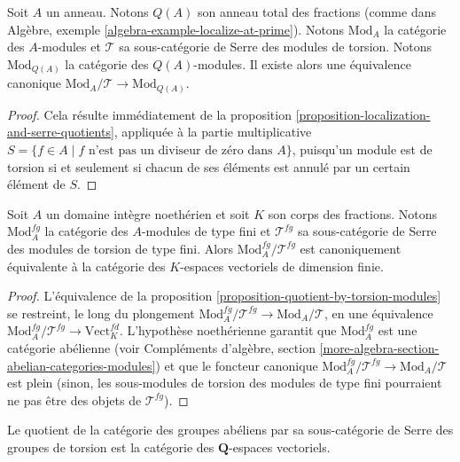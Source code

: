 \begin{proposition}
\label{proposition-quotient-by-torsion-modules}
Soit $A$ un anneau. Notons $Q(A)$ son anneau total des fractions
(comme dans Algèbre, exemple \ref{algebra-example-localize-at-prime}).
Notons $\text{Mod}_A$ la catégorie des $A$-modules et $\mathcal{T}$ sa
sous-catégorie de Serre des modules de torsion. Notons
$\text{Mod}_{Q(A)}$ la catégorie des $Q(A)$-modules.
Il existe alors une équivalence canonique
$\text{Mod}_A/\mathcal{T} \rightarrow \text{Mod}_{Q(A)}$.
\end{proposition}

\begin{proof}
Cela résulte immédiatement de la proposition \ref{proposition-localization-and-serre-quotients}, appliquée à la partie
multiplicative
$S = \{f \in A \mid f \text{ n'est pas un diviseur de zéro dans }A\}$,
puisqu'un module est de torsion si et seulement si chacun de ses éléments
est annulé par un certain élément de $S$.
\end{proof}

\begin{proposition}
\label{proposition-quotient-by-finitely-generated-torsion-modules}
Soit $A$ un domaine intègre noethérien et soit $K$ son corps des fractions.
Notons $\text{Mod}_A^{fg}$ la catégorie des $A$-modules de type fini
et $\mathcal{T}^{fg}$ sa sous-catégorie de Serre des modules de torsion
de type fini. Alors $\text{Mod}_A^{fg}/\mathcal{T}^{fg}$ est canoniquement
équivalente à la catégorie des $K$-espaces vectoriels de dimension finie.
\end{proposition}

\begin{proof}
L'équivalence de la proposition
\ref{proposition-quotient-by-torsion-modules} se restreint, le long du
plongement $\text{Mod}_A^{fg}/\mathcal{T}^{fg} \to \text{Mod}_A/\mathcal{T}$,
en une équivalence
$\text{Mod}_A^{fg}/\mathcal{T}^{fg} \to \text{Vect}_K^{fd}$.
L'hypothèse noethérienne garantit que $\text{Mod}_A^{fg}$ est une
catégorie abélienne (voir Compléments d'algèbre, section
\ref{more-algebra-section-abelian-categories-modules}) et que le foncteur canonique
$\text{Mod}_A^{fg}/\mathcal{T}^{fg} \to \text{Mod}_A/\mathcal{T}$
est plein (sinon, les sous-modules de torsion des modules de type fini
pourraient ne pas être des objets de $\mathcal{T}^{fg}$).
\end{proof}

\begin{proposition}
\label{proposition-quotient-abelian-groups-by-torsion-groups}
Le quotient de la catégorie des groupes abéliens par sa
sous-catégorie de Serre des groupes de torsion est la catégorie des
$\mathbf{Q}$-espaces vectoriels.
\end{proposition}


